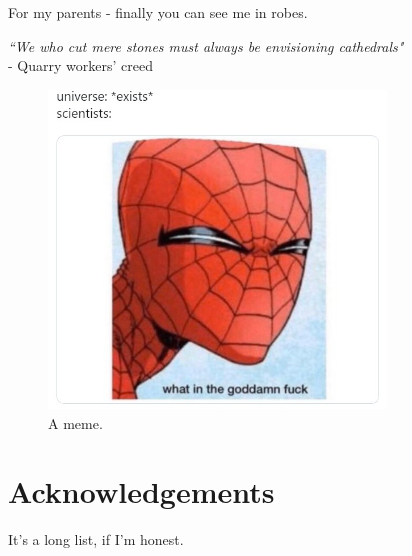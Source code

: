 \newpage
\noindent\large{For my parents - finally you can see me in robes.}\newline
\mbox{}
\vfill
\begin{flushright}
\large{\emph{``We who cut mere stones must always be envisioning cathedrals"\\} 
- Quarry workers' creed}
\end{flushright}


\newpage
\thispagestyle{empty}
\vspace{7cm}
\begin{figure}
\centering
\includegraphics[width=0.8\textwidth]{fig/misc/spidey.jpeg}
\caption{A meme.}
\end{figure}

\vfill
\section*{Acknowledgements}

It's a long list, if I'm honest.


\newpage

